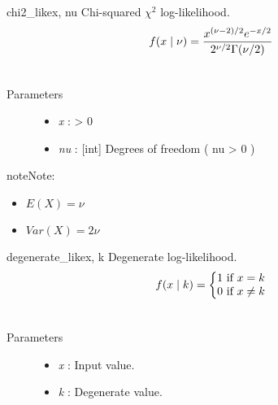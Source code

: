 \hypertarget{pymc.distributions.chi2_like}{}\begin{funcdesc}{chi2\_like}{x, nu}
Chi-squared $\chi^2$ log-likelihood.
\begin{gather}
\begin{split}f(x \mid \nu) = \frac{x^{(\nu-2)/2}e^{-x/2}}{2^{\nu/2}\Gamma(\nu/2)}\end{split}\notag\\\begin{split}\end{split}\notag
\end{gather}\begin{description}
\item[Parameters] \leavevmode\begin{itemize}
\item {}
\emph{x} : \textgreater{} 0

\item {}
\emph{nu} : {[}int{]} Degrees of freedom ( nu \textgreater{} 0 )

\end{itemize}

\end{description}

\begin{notice}{note}{Note:}\begin{itemize}
\item {}
$E(X)=\nu$

\item {}
$Var(X)=2\nu$

\end{itemize}
\end{notice}
\end{funcdesc}

\hypertarget{pymc.distributions.degenerate_like}{}\begin{funcdesc}{degenerate\_like}{x, k}
Degenerate log-likelihood.
\begin{gather}
\begin{split}f(x \mid k) = \left\{ \begin{matrix} 1 \text{ if } x = k \\ 0 \text{ if } x \ne k\end{matrix} \right.\end{split}\notag\\\begin{split}\end{split}\notag
\end{gather}\begin{description}
\item[Parameters] \leavevmode\begin{itemize}
\item {}
\emph{x} : Input value.

\item {}
\emph{k} : Degenerate value.

\end{itemize}

\end{description}
\end{funcdesc}

